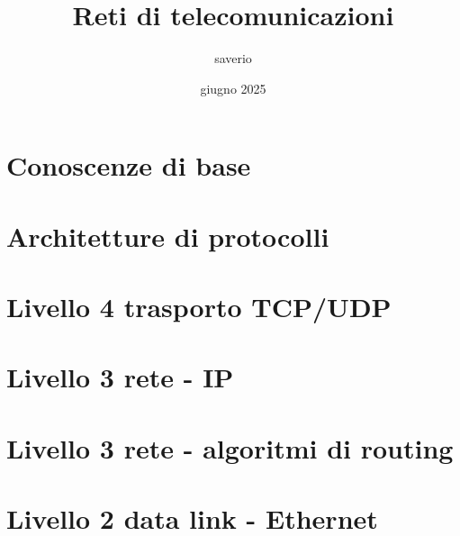 \documentclass{report}
\title{Reti di telecomunicazioni}
\author{saverio}
\date{giugno 2025}
\begin{document}
\maketitle
\tableofcontents


\chapter{Conoscenze di base}



\chapter{Architetture di protocolli}


\chapter{Livello 4 trasporto TCP/UDP}


\chapter{Livello 3 rete - IP}


\chapter{Livello 3 rete - algoritmi di routing}


\chapter{Livello 2 data link - Ethernet}
\end{document}
